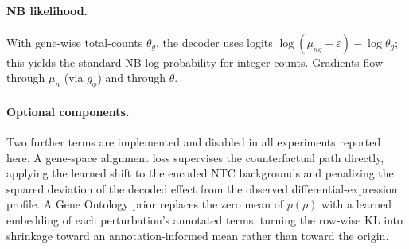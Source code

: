 \paragraph{NB likelihood.}
With gene-wise total-counts $\theta_g$, the decoder uses logits
$\log(\mu_{ng}{+}\varepsilon)-\log \theta_g$; this yields the standard NB log-probability for integer
counts. Gradients flow through $\mu_n$ (via $g_\phi$) and through $\theta$.

\paragraph{Optional components.}
Two further terms are implemented and disabled in all experiments reported here. A gene-space
alignment loss supervises the counterfactual path directly, applying the learned shift to the encoded
NTC backgrounds and penalizing the squared deviation of the decoded effect from the observed
differential-expression profile. A Gene Ontology prior replaces the zero mean of $p(\rho)$ with a
learned embedding of each perturbation's annotated terms, turning the row-wise KL into shrinkage
toward an annotation-informed mean rather than toward the origin.
